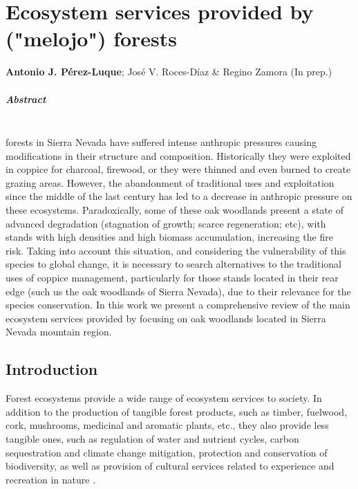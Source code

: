 %
\chapter{Ecosystem services provided by \Qpw ("melojo") forests}\label{sec:es}

\mbox{}
\vfill
{\color{ctcolormain}\textbf{Antonio J. Pérez-Luque}}; José V. Roces-Díaz \& Regino Zamora (In prep.)


\newpage

\paragraph{Abstract} \mbox{} \\
\Qp forests in Sierra Nevada have suffered intense anthropic pressures causing modifications in their structure and composition. Historically they were exploited in coppice for charcoal, firewood, or they were thinned and even burned to create grazing areas. However, the abandonment of traditional uses and exploitation since the middle of the last century has led to a decrease in anthropic pressure on these ecosystems. Paradoxically, some of these oak woodlands present a state of advanced degradation (stagnation of growth; scarce regeneration; etc), with stands with high densities and high biomass accumulation, increasing the fire risk. Taking into account this situation, and considering the vulnerability of this species to global change, it is necessary to search alternatives to the traditional uses of coppice management, particularly for those stands located in their rear edge (such us the oak woodlands of Sierra Nevada), due to their relevance for the species conservation. 
In this work we present a comprehensive review of the main ecosystem services provided by \Qpy focusing on oak woodlands located in Sierra Nevada mountain region.
\newpage

\section{Introduction}\label{sec:es:intro}

Forest ecosystems provide a wide range of ecosystem services to society. In addition to the production of tangible forest products, such as timber, fuelwood, cork, mushrooms, medicinal and aromatic plants, etc., they also provide less tangible ones, such as regulation of water and nutrient cycles, carbon sequestration and climate change mitigation, protection and conservation of biodiversity, as well as provision of cultural services related to experience and recreation in nature \autocite{Acharyaetal2019GlobalTrend,Baetenetal2019IdentifyingTree,deGrootetal2002TypologyClassification,FelipeLuciaetal2018MultipleForest,Gamfeldtetal2013HigherLevels,Iversonetal2018EcosystemServices,Stengeretal2009ValuingEnvironmental}. 

